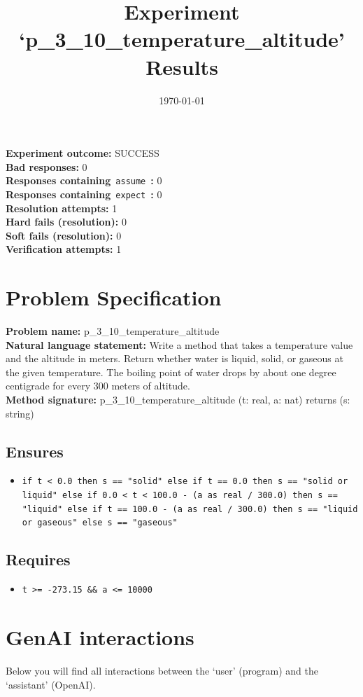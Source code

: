 \documentclass{article}
\begin{document}
\title{Experiment `p\_3\_10\_temperature\_altitude' Results}
\author{\today}
\date{}
\maketitle
\textbf{Experiment outcome: }SUCCESS
\\\textbf{Bad responses: }0
\\\textbf{Responses containing}~\texttt{assume}~\textbf{: }0
\\\textbf{Responses containing}~\texttt{expect}~\textbf{: }0
\\\textbf{Resolution attempts: }1
\\\textbf{Hard fails (resolution): }0
\\\textbf{Soft fails (resolution): }0
\\\textbf{Verification attempts: }1
\section*{Problem Specification}
\textbf{Problem name: }p\_3\_10\_temperature\_altitude
\\\textbf{Natural language statement: }Write a method that takes a temperature value and the altitude in meters. Return whether water is liquid, solid, or gaseous at the given temperature. The boiling point of water drops by about one degree centigrade for every 300 meters of altitude.
\\\textbf{Method signature: }p\_3\_10\_temperature\_altitude (t: real, a: nat) returns (s: string)
\subsection*{Ensures}
\begin{itemize}
\item \texttt{if t < 0.0 then s == "solid" else if t == 0.0 then s == "solid or liquid" else if 0.0 < t < 100.0 - (a as real / 300.0) then s == "liquid" else if t == 100.0 - (a as real / 300.0) then s == "liquid or gaseous" else s == "gaseous"}
\end{itemize}
\subsection*{Requires}
\begin{itemize}
\item \texttt{t >= -273.15 \&\& a <= 10000}
\end{itemize}
\clearpage
\section*{GenAI interactions}
Below you will find all interactions between the `user' (program) and the `assistant' (OpenAI).
\end{document}
